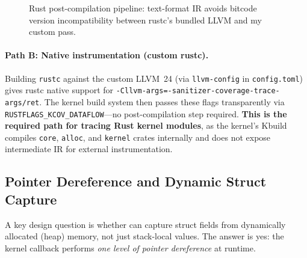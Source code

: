 \documentclass{article}
\begin{document}
\begin{figure}[t]
\centering
{}
\caption{Rust post-compilation pipeline: text-format IR avoids bitcode version
incompatibility between rustc's bundled LLVM and my custom pass.}\label{fig:rust-pipeline}
\end{figure}

\paragraph{Path B: Native instrumentation (custom rustc).}
Building \texttt{rustc} against the custom LLVM~24 (via
\texttt{llvm-config} in \texttt{config.toml}) gives rustc native support for
\texttt{-Cllvm-args=-sanitizer-coverage-trace-args/ret}. The kernel build
system then passes these flags transparently via
\texttt{RUSTFLAGS\_KCOV\_DATAFLOW}---no post-compilation step required.
\textbf{This is the required path for tracing Rust kernel modules}, as the
kernel's Kbuild compiles \texttt{core}, \texttt{alloc}, and \texttt{kernel}
crates internally and does not expose intermediate IR for external
instrumentation.


\subsection{Pointer Dereference and Dynamic Struct Capture}\label{sec:deref}

A key design question is whether \toolname{} can capture struct fields from
dynamically allocated (heap) memory, not just stack-local values. The answer is
yes: the kernel callback performs \emph{one level of pointer dereference} at
runtime.
\end{document}
